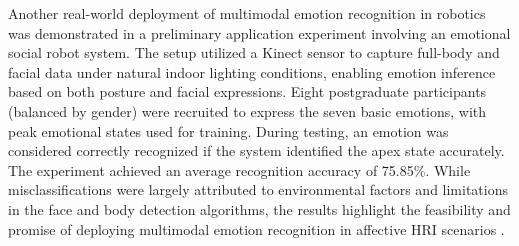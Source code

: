 Another real-world deployment of multimodal emotion recognition in robotics was demonstrated in a preliminary application experiment involving an emotional social robot system. The setup utilized a Kinect sensor to capture full-body and facial data under natural indoor lighting conditions, enabling emotion inference based on both posture and facial expressions. Eight postgraduate participants (balanced by gender) were recruited to express the seven basic emotions, with peak emotional states used for training. During testing, an emotion was considered correctly recognized if the system identified the apex state accurately. The experiment achieved an average recognition accuracy of 75.85\%. While misclassifications were largely attributed to environmental factors and limitations in the face and body detection algorithms, the results highlight the feasibility and promise of deploying multimodal emotion recognition in affective HRI scenarios \cite{Chen2023-ss}.

